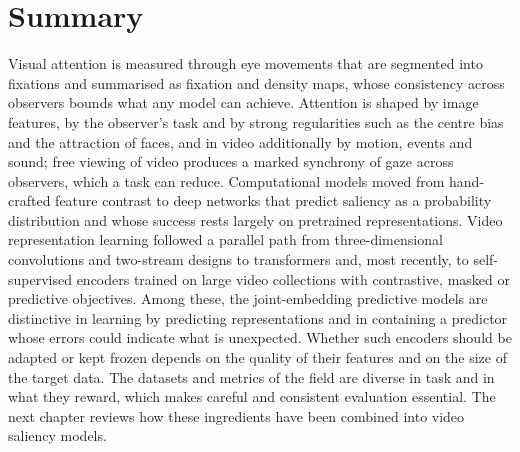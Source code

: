 \section{Summary}\label{sec:literature-summary}

Visual attention is measured through eye movements that are segmented into
fixations and summarised as fixation and density maps, whose consistency across
observers bounds what any model can achieve. Attention is shaped by image
features, by the observer's task and by strong regularities such as the centre
bias and the attraction of faces, and in video additionally by motion, events
and sound; free viewing of video produces a marked synchrony of gaze across
observers, which a task can reduce. Computational models moved from hand-crafted
feature contrast to deep networks that predict saliency as a probability
distribution and whose success rests largely on pretrained representations.
Video representation learning followed a parallel path from three-dimensional
convolutions and two-stream designs to transformers and, most recently, to
self-supervised encoders trained on large video collections with contrastive,
masked or predictive objectives. Among these, the joint-embedding predictive
models are distinctive in learning by predicting representations and in
containing a predictor whose errors could indicate what is unexpected. Whether
such encoders should be adapted or kept frozen depends on the quality of their
features and on the size of the target data. The datasets and metrics of the
field are diverse in task and in what they reward, which makes careful and
consistent evaluation essential. The next chapter reviews how these ingredients
have been combined into video saliency models.
